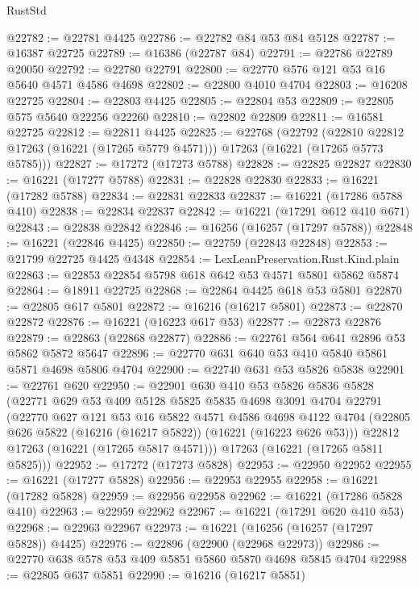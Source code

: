 \begin{lexlean}{RustStd}
\begin{coremodule}
@22782 := @22781 @4425
@22786 := @22782 @84 @53 @84 @5128
@22787 := @16387 @22725
@22789 := @16386 (@22787 @84)
@22791 := @22786 @22789 @20050
@22792 := @22780 @22791
@22800 := @22770 @576 @121 @53 @16 @5640 @4571 @4586 @4698
@22802 := @22800 @4010 @4704
@22803 := @16208 @22725
@22804 := @22803 @4425
@22805 := @22804 @53
@22809 := @22805 @575 @5640 @22256 @22260
@22810 := @22802 @22809
@22811 := @16581 @22725
@22812 := @22811 @4425
@22825 := @22768
    (@22792
      (@22810 @22812 @17263 (@16221 (@17265 @5779 @4571)))
      @17263
      (@16221 (@17265 @5773 @5785)))
@22827 := @17272 (@17273 @5788)
@22828 := @22825 @22827
@22830 := @16221 (@17277 @5788)
@22831 := @22828 @22830
@22833 := @16221 (@17282 @5788)
@22834 := @22831 @22833
@22837 := @16221 (@17286 @5788 @410)
@22838 := @22834 @22837
@22842 := @16221 (@17291 @612 @410 @671)
@22843 := @22838 @22842
@22846 := @16256 (@16257 (@17297 @5788))
@22848 := @16221 (@22846 @4425)
@22850 := @22759 (@22843 @22848)
@22853 := @21799 @22725 @4425 @4348
@22854 := LexLeanPreservation.Rust.Kind.plain
@22863 := @22853 @22854 @5798 @618 @642 @53 @4571 @5801 @5862 @5874
@22864 := @18911 @22725
@22868 := @22864 @4425 @618 @53 @5801
@22870 := @22805 @617 @5801
@22872 := @16216 (@16217 @5801)
@22873 := @22870 @22872
@22876 := @16221 (@16223 @617 @53)
@22877 := @22873 @22876
@22879 := @22863 (@22868 @22877)
@22886 := @22761 @564 @641 @2896 @53 @5862 @5872 @5647
@22896 := @22770 @631 @640 @53 @410 @5840 @5861 @5871 @4698 @5806 @4704
@22900 := @22740 @631 @53 @5826 @5838
@22901 := @22761 @620
@22950 := @22901
    @630
    @410
    @53
    @5826
    @5836
    @5828
    (@22771
      @629
      @53
      @409
      @5128
      @5825
      @5835
      @4698
      @3091
      @4704
      @22791
      (@22770
        @627
        @121
        @53
        @16
        @5822
        @4571
        @4586
        @4698
        @4122
        @4704
        (@22805 @626 @5822 (@16216 (@16217 @5822)) (@16221 (@16223 @626 @53)))
        @22812
        @17263
        (@16221 (@17265 @5817 @4571)))
      @17263
      (@16221 (@17265 @5811 @5825)))
@22952 := @17272 (@17273 @5828)
@22953 := @22950 @22952
@22955 := @16221 (@17277 @5828)
@22956 := @22953 @22955
@22958 := @16221 (@17282 @5828)
@22959 := @22956 @22958
@22962 := @16221 (@17286 @5828 @410)
@22963 := @22959 @22962
@22967 := @16221 (@17291 @620 @410 @53)
@22968 := @22963 @22967
@22973 := @16221 (@16256 (@16257 (@17297 @5828)) @4425)
@22976 := @22896 (@22900 (@22968 @22973))
@22986 := @22770 @638 @578 @53 @409 @5851 @5860 @5870 @4698 @5845 @4704
@22988 := @22805 @637 @5851
@22990 := @16216 (@16217 @5851)

\end{coremodule}
\end{lexlean}
